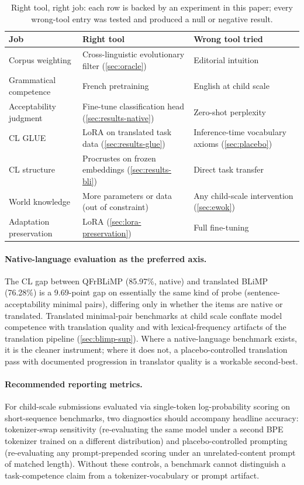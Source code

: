 \documentclass[11pt]{article}
\begin{document}
\begin{table}[t]
\centering
\small
\begin{tabular}{@{}p{3cm}p{6.5cm}p{5.8cm}@{}}
\toprule
Job & Right tool & Wrong tool tried \\
\midrule
Corpus weighting & Cross-linguistic evolutionary filter (\autoref{sec:oracle}) & Editorial intuition \\
Grammatical competence & French pretraining & English at child scale \\
Acceptability judgment & Fine-tune classification head (\autoref{sec:results-native}) & Zero-shot perplexity \\
CL GLUE & LoRA on translated task data (\autoref{sec:results-glue}) & Inference-time vocabulary axioms (\autoref{sec:placebo}) \\
CL structure & Procrustes on frozen embeddings (\autoref{sec:results-bli}) & Direct task transfer \\
World knowledge & More parameters or data (out of constraint) & Any child-scale intervention (\autoref{sec:ewok}) \\
Adaptation preservation & LoRA (\autoref{sec:lora-preservation}) & Full fine-tuning \\
\bottomrule
\end{tabular}
\caption{Right tool, right job: each row is backed by an experiment in this paper; every wrong-tool entry was tested and produced a null or negative result.}
\label{tab:right-tool}
\vspace{-1.5em}
\end{table}

\paragraph{Native-language evaluation as the preferred axis.} The CL gap between QFrBLiMP (85.97\%, native) and translated BLiMP (76.28\%) is a 9.69-point gap on essentially the same kind of probe (sentence-acceptability minimal pairs), differing only in whether the items are native or translated. Translated minimal-pair benchmarks at child scale conflate model competence with translation quality and with lexical-frequency artifacts of the translation pipeline (\autoref{sec:blimp-sup}). Where a native-language benchmark exists, it is the cleaner instrument; where it does not, a placebo-controlled translation pass with documented progression in translator quality is a workable second-best.

\paragraph{Recommended reporting metrics.} For child-scale submissions evaluated via single-token log-probability scoring on short-sequence benchmarks, two diagnostics should accompany headline accuracy: tokenizer-swap sensitivity (re-evaluating the same model under a second BPE tokenizer trained on a different distribution) and placebo-controlled prompting (re-evaluating any prompt-prepended scoring under an unrelated-content prompt of matched length). Without these controls, a benchmark cannot distinguish a task-competence claim from a tokenizer-vocabulary or prompt artifact.
\end{document}
